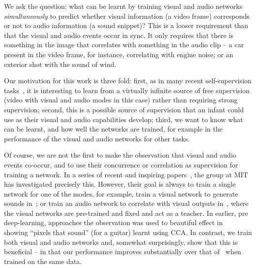\documentclass[10pt,twocolumn,letterpaper]{article}
\begin{document}
We ask the question: what can be learnt by training visual and audio
networks {\em simultaneously} to predict whether visual information
(a video frame) corresponds or not to audio information (a sound snippet)?
This is a looser requirement than that the visual and audio
events occur in sync. It only requires that there is something in
the image that correlates with something in the audio clip -- a car present
in the video frame, for instance, correlating with engine noise; or an  exterior shot with the sound of wind.

Our motivation for this work is three fold: first, as in many recent
self-supervision tasks~\cite{Dosovitskiy14,Doersch15,Agrawal15,Wang15,Zhang16,Misra16,Pathak16,Noroozi16}, it
is interesting to learn from a virtually infinite source of free
supervision (video with visual and audio modes in this case) rather
than requiring strong supervision; second, this is a possible source
of supervision that an infant could use as their visual and audio
capabilities develop; third, we want to know what can be learnt, and
how well the networks are trained, for example in the performance of
the visual and audio networks for other tasks.

Of course, we are not the first to make the observation that visual
and audio events co-occur, and to use their concurrence or correlation
as supervision for training a network. In a series of recent and
inspiring papers~\cite{Owens16,Owens16a,Aytar16,Harwath16}, the group
at MIT has investigated precisely this. However, their goal is always
to train a single network for one of the modes, for example, train a
visual network to generate sounds in~\cite{Owens16,Owens16a}; or train
an audio network to correlate with visual outputs
in~\cite{Aytar16,Harwath16}, where the visual networks are pre-trained
and fixed and act as a teacher.  In earlier, pre deep-learning,
approaches the observation was used to beautiful effect
in~\cite{Kidron05} showing ``pixels that sound'' (\eg for a guitar)
learnt using CCA. In contrast, we train both visual and audio networks and,
somewhat surprisingly, show that this is beneficial -- in that our
performance improves substantially over that of~\cite{Aytar16} when
trained on the same data.
\end{document}
